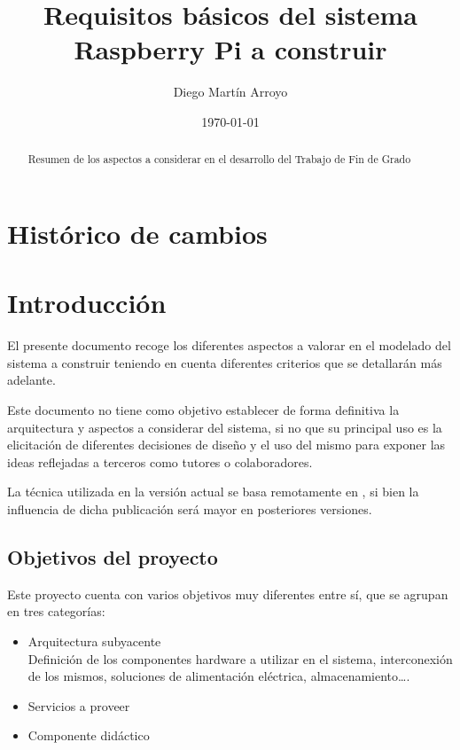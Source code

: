 \documentclass{article}
\title{Requisitos básicos del sistema Raspberry Pi a construir}
\author{Diego Martín Arroyo}
\date{\today} %
\begin{document}
\maketitle

\begin{abstract}
Resumen de los aspectos a considerar en el desarrollo del Trabajo de Fin de Grado
\end{abstract}

\section{Histórico de cambios}



\section{Introducción}

El presente documento recoge los diferentes aspectos a valorar en el modelado del sistema a construir teniendo en cuenta diferentes criterios que se detallarán más adelante.

Este documento no tiene como objetivo establecer de forma definitiva la arquitectura y aspectos a considerar del sistema, si no que su principal uso es la elicitación de diferentes decisiones de diseño y el uso del mismo para exponer las ideas reflejadas a terceros como tutores o colaboradores.

La técnica utilizada en la versión actual se basa remotamente en \cite{Toro99arequirements}, si bien la influencia de dicha publicación será mayor en posteriores versiones.

\subsection{Objetivos del proyecto}

Este proyecto cuenta con varios objetivos muy diferentes entre sí, que se agrupan en tres categorías:
\begin{itemize}
  \item Arquitectura subyacente\\
  Definición de los componentes hardware a utilizar en el sistema, interconexión de los mismos, soluciones de alimentación eléctrica, almacenamiento\dots.
  \item Servicios a proveer\\
  \item Componente didáctico\\
\end{itemize}
\end{document}
